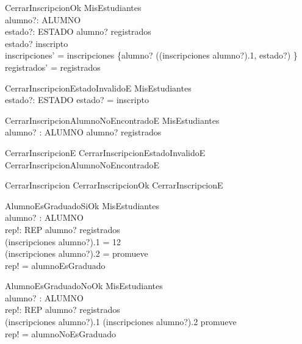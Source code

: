 \begin{schema}{CerrarInscripcionOk}
    \Delta MisEstudiantes \\
    alumno?: ALUMNO \\
    estado?: ESTADO
    \where
    alumno? \in registrados \\
    estado? \neq inscripto \\
    inscripciones' = inscripciones \oplus \{alumno? \mapsto ((inscripciones alumno?).1, estado?) \} \\
    registrados' = registrados
\end{schema}

\begin{schema}{CerrarInscripcionEstadoInvalidoE}
    \Xi MisEstudiantes \\
    estado?: ESTADO
    \where
    estado? = inscripto
\end{schema}

\begin{schema}{CerrarInscripcionAlumnoNoEncontradoE}
    \Xi MisEstudiantes \\
    alumno? : ALUMNO
    \where
    alumno? \notin registrados
\end{schema}

\begin{zed}
    CerrarInscripcionE  CerrarInscripcionEstadoInvalidoE \lor CerrarInscripcionAlumnoNoEncontradoE
\end{zed}
\begin{zed}
    CerrarInscripcion  CerrarInscripcionOk \lor CerrarInscripcionE
\end{zed}

\begin{schema}{AlumnoEsGraduadoSiOk}
    \Xi MisEstudiantes \\
    alumno? : ALUMNO \\
    rep!: REP
    \where
    alumno? \in registrados \\
    (inscripciones alumno?).1 = 12 \\
    (inscripciones alumno?).2 = promueve \\
    rep! = alumnoEsGraduado
\end{schema}

\begin{schema}{AlumnoEsGraduadoNoOk}
    \Xi MisEstudiantes \\
    alumno? : ALUMNO \\
    rep!: REP
    \where
    alumno? \in registrados \\
    (inscripciones alumno?).1  \lor (inscripciones alumno?).2 \neq promueve \\
    rep! = alumnoNoEsGraduado
\end{schema}

